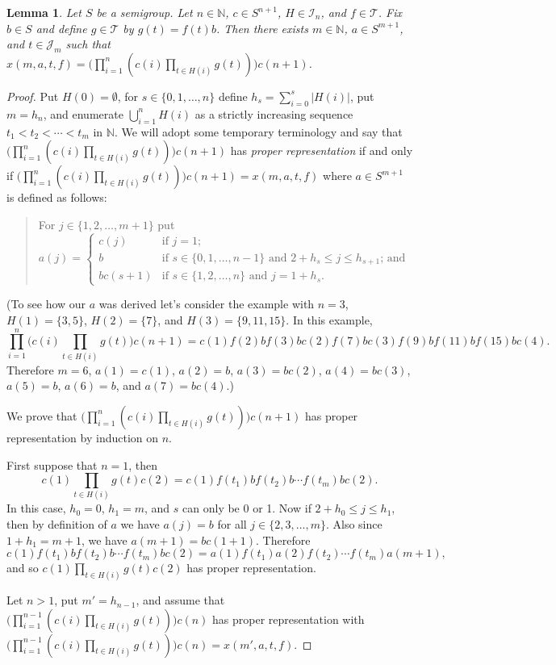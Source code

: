 \documentclass[12pt]{article}
\theoremstyle{plain}
\newtheorem{lem}[thm]{Lemma}
\theoremstyle{definition}
\newcommand{\bbN}{\mathbb{N}}
\newcommand{\calI}{\mathcal{I}}
\newcommand{\calJ}{\mathcal{J}}
\newcommand{\calT}{\mathcal{T}}
\begin{document}
\begin{lem}
  Let $S$ be a semigroup.
  Let $n \in \bbN$, $c \in S^{n+1}$, $H \in \calI_n$, and $f \in \calT$.
  Fix $b \in S$ and define $g \in \calT$ by $g(t) = f(t)b$.
  Then there exists $m \in \bbN$, $a \in S^{m+1}$, and $t \in \calJ_m$ such that $x(m, a, t, f) = \bigl(\prod_{i=1}^n ( c(i)\prod_{t \in H(i)} g(t)) \bigr) c(n+1)$.
\end{lem}
\begin{proof}
  Put $H(0) = \emptyset$, for $s \in \{0, 1, \ldots, n\}$ define $h_s = \sum_{i=0}^s |H(i)|$, put $m = h_n$, and enumerate $\bigcup_{i=1}^n H(i)$ as a strictly increasing sequence $t_1 < t_2 < \cdots < t_m$ in $\bbN$. 
  We will adopt some temporary terminology and say that $\bigl(\prod_{i=1}^n ( c(i)\prod_{t \in H(i)} g(t)) \bigr) c(n+1)$ has \textsl{proper representation} if and only if $\bigl(\prod_{i=1}^n ( c(i)\prod_{t \in H(i)} g(t)) \bigr) c(n+1) = x(m, a, t, f)$ where $a \in S^{m+1}$ is defined as follows: 
  \begin{quote}
    For $j \in \{1, 2, \ldots, m+1\}$ put
    \[
      a(j) = 
      \begin{cases}
        c(j) & \mbox{if $j=1$;} \\
        b    & \mbox{if $s \in \{0, 1, \ldots, n-1\}$ and $2+h_s \le j \le h_{s+1}$; and } \\
        bc(s+1) & \mbox{if $s \in \{1, 2, \ldots, n\}$ and $j = 1+h_s$.}
      \end{cases}
    \]
  \end{quote}
  (To see how our $a$ was derived let's consider the example with $n = 3$, $H(1) = \{3, 5\}$, $H(2) = \{7\}$, and $H(3) = \{9, 11, 15\}$. 
  In this example,
  \[
    \prod_{i=1}^n\bigl( c(i) \prod_{t \in H(i)} g(t) \bigr) c(n+1) = c(1)f(2)bf(3)b c(2) f(7)bc(3)f(9)bf(11)bf(15)bc(4).
  \]
  Therefore $m = 6$, $a(1) = c(1)$, $a(2) = b$, $a(3) = bc(2)$, $a(4) = bc(3)$, $a(5) = b$, $a(6) = b$, and $a(7) = bc(4)$.)
  
  We prove that $\bigl(\prod_{i=1}^n ( c(i)\prod_{t \in H(i)} g(t)) \bigr) c(n+1)$ has proper representation by induction on $n$.

  First suppose that $n=1$, then
  \[
    c(1)\prod_{t \in H(i)} g(t) c(2) = c(1)f(t_1)bf(t_2)b \cdots f(t_m)bc(2).
  \]
  In this case, $h_0 = 0$, $h_1 = m$, and $s$ can only be 0 or 1.
  Now if $2+h_0 \le j \le h_1$, then by definition of $a$ we have $a(j) = b$ for all $j \in \{2, 3, \ldots, m\}$. 
  Also since $1+h_1 = m+1$, we have $a(m+1) = bc(1+1)$.
  Therefore
  \[
    c(1)f(t_1)bf(t_2)b \cdots f(t_m)bc(2) = a(1)f(t_1)a(2)f(t_2) \cdots f(t_m)a(m+1),
  \]
and so $c(1)\prod_{t \in H(i)} g(t) c(2)$ has proper representation. 

  Let $n > 1$, put $m' = h_{n-1}$, and assume that $\bigl(\prod_{i=1}^{n-1} ( c(i)\prod_{t \in H(i)} g(t)) \bigr) c(n)$ has proper representation with $\bigl(\prod_{i=1}^{n-1} ( c(i)\prod_{t \in H(i)} g(t)) \bigr) c(n) = x(m', a, t, f)$. 
\end{proof}
\end{document}
